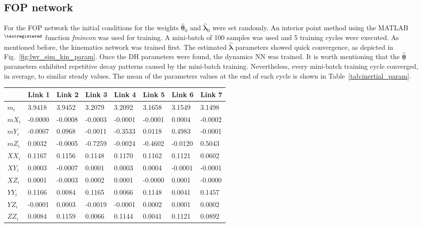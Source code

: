 \subsection{FOP network}
For the FOP network the initial conditions for the weights $\hat{\bm{\theta}}_0$ and $\hat{\bm{\lambda}}_0$ were set randomly. An interior point method using the MATLAB$^{\tiny{\textregistered}}$ function \emph{fmincon} was used for training. A mini-batch of 100 samples was used and 5 training cycles were executed. As mentioned before, the kinematics network was trained first. The estimated $\hat{\bm{\lambda}}$ parameters showed quick convergence, as depicted in Fig.~\ref{fig:lwr_sim_kin_param}. Once the DH parameters were found, the dynamics NN was trained. It is worth mentioning that the $\hat{\bm{\theta}}$ parameters exhibited repetitive decay patterns caused by the mini-batch training. Nevertheless, every mini-batch training cycle converged, in average, to similar steady values. The mean of the parameters values at the end of each cycle is shown in Table~\ref{tab:inertial_param}. 
\begin{table*}[t]
\begin{center}
\begin{tabular}{ |l|l|l|l||l||l||l||l| } 
 \hline
&  \textbf{Link 1} &  \textbf{Link 2} & \textbf{Link 3} & \textbf{Link 4} & \textbf{Link 5} & \textbf{Link 6} & \textbf{Link 7}\\
\hline
$m_i$  &   3.9418 &  3.9452 &  3.2079 &  3.2092 &  3.1658 &  3.1549 &  3.1498\\
\hline
$mX_i$ &  -0.0000 & -0.0008 & -0.0003 & -0.0001 & -0.0001 &  0.0004 & -0.0002\\
\hline
$mY_i$ &  -0.0007 &  0.0968 & -0.0011 & -0.3533 &  0.0118 &  0.4983 & -0.0001\\
\hline
$mZ_i$ &   0.0032 & -0.0005 & -0.7259 & -0.0024 & -0.4602 & -0.0120 &  0.5043\\
\hline
$XX_i$ &   0.1167 &  0.1156 &  0.1148 &  0.1170 &  0.1162 &  0.1121 &  0.0602\\
\hline
$XY_i$ &   0.0003 & -0.0007 &  0.0001 &  0.0003 &  0.0004 & -0.0001 & -0.0001\\
\hline
$XZ_i$ &   0.0001 & -0.0003 &  0.0002 &  0.0001 & -0.0000 &  0.0001 & -0.0000\\
\hline
$YY_i$ &   0.1166 &  0.0084 &  0.1165 &  0.0066 &  0.1148 &  0.0041 &  0.1457\\
\hline
$YZ_i$ &  -0.0001 &  0.0003 & -0.0019 & -0.0001 &  0.0002 &  0.0001 &  0.0002\\
\hline
$ZZ_i$ &   0.0084 &  0.1159 &  0.0066 &  0.1144 &  0.0041 &  0.1121 &  0.0892\\
 \hline
\end{tabular}
\end{center}
  \caption{Average value of the estimated inertial parameters after training.}
  \label{tab:inertial_param}
\end{table*}
